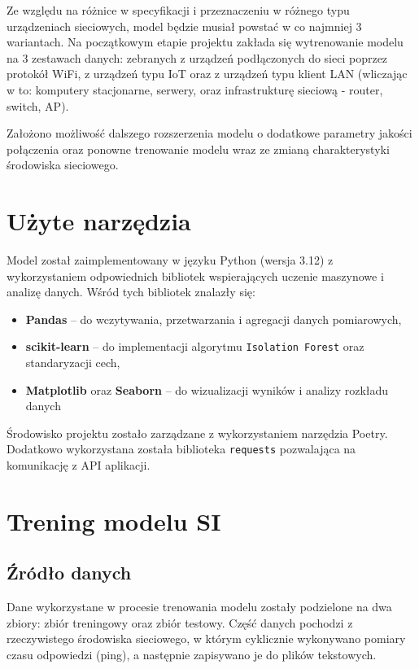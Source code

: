 Ze względu na różnice w specyfikacji i przeznaczeniu w różnego typu urządzeniach sieciowych, model będzie musiał powstać w co najmniej 3 wariantach. Na początkowym etapie projektu zakłada się wytrenowanie modelu na 3 zestawach danych: zebranych z urządzeń podłączonych do sieci poprzez protokół WiFi, z urządzeń typu IoT oraz z urządzeń typu klient LAN (wliczając w to: komputery stacjonarne, serwery, oraz infrastrukturę sieciową - router, switch, AP).

Założono możliwość dalszego rozszerzenia modelu o dodatkowe parametry jakości połączenia oraz ponowne trenowanie modelu wraz ze zmianą charakterystyki środowiska sieciowego.

\section{Użyte narzędzia}

Model został zaimplementowany w języku Python (wersja 3.12) z wykorzystaniem odpowiednich bibliotek wspierających uczenie maszynowe i analizę danych. Wśród tych bibliotek znalazły się:
\begin{itemize}
	\item \textbf{Pandas} – do wczytywania, przetwarzania i agregacji danych pomiarowych,
	\item \textbf{scikit-learn} – do implementacji algorytmu \texttt{Isolation Forest} oraz standaryzacji cech,
	\item \textbf{Matplotlib} oraz \textbf{Seaborn} – do wizualizacji wyników i analizy rozkładu danych
\end{itemize}

Środowisko projektu zostało zarządzane z wykorzystaniem narzędzia Poetry. Dodatkowo wykorzystana została biblioteka \texttt{requests} pozwalająca na komunikację z API aplikacji.

\section{Trening modelu SI}

\subsection{Źródło danych}

Dane wykorzystane w procesie trenowania modelu zostały podzielone na dwa zbiory: zbiór treningowy oraz zbiór testowy. Część danych pochodzi z rzeczywistego środowiska sieciowego, w którym cyklicznie wykonywano pomiary czasu odpowiedzi (ping), a następnie zapisywano je do plików tekstowych.

